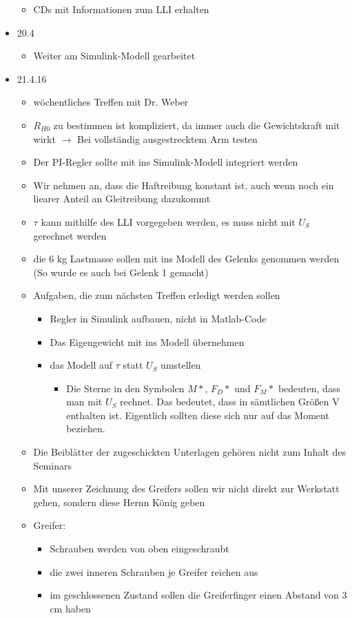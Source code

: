 \documentclass[a4paper,12pt]{article}
\begin{document}
\begin{itemize}
\begin{itemize}
		\item CDs mit Informationen zum LLI erhalten
	\end{itemize}
	\item 20.4
	\begin{itemize}
		\item Weiter am Simulink-Modell gearbeitet
	\end{itemize}
	\item 21.4.16
	\begin{itemize}
		\item wöchentliches Treffen mit Dr. Weber
		\item $R_{H0}$ zu bestimmen ist kompliziert, da immer auch die Gewichtskraft mit wirkt $\rightarrow$ Bei vollständig ausgestrecktem Arm testen
		\item Der PI-Regler sollte mit ins Simulink-Modell integriert werden
		\item Wir nehmen an, dass die Haftreibung konstant ist, auch wenn noch ein liearer Anteil an Gleitreibung dazukommt
		\item $\tau$ kann mithilfe des LLI vorgegeben werden, es muss nicht mit $U_S$ gerechnet werden
		\item die 6 kg Lastmasse sollen mit ins Modell des Gelenks genommen werden (So wurde es auch bei Gelenk 1 gemacht)
		\item Aufgaben, die zum nächsten Treffen erledigt werden sollen
			\begin{itemize}
				\item Regler in Simulink aufbauen, nicht in Matlab-Code
				\item Das Eigengewicht mit ins Modell übernehmen
				\item das Modell auf $\tau$ statt $U_S$ umstellen
				\begin{itemize}
					\item Die Sterne in den Symbolen $M*$, $F_D*$ und $F_M*$ bedeuten, dass man mit $U_S$ rechnet. Das bedeutet, dass in sämtlichen Größen V enthalten ist. Eigentlich sollten diese sich nur auf das Moment beziehen.
				\end{itemize}
			\end{itemize}
		\item Die Beiblätter der zugeschickten Unterlagen gehören nicht zum Inhalt des Seminars
		\item Mit unserer Zeichnung des Greifers sollen wir nicht direkt zur Werkstatt gehen, sondern diese Hernn König geben
		\item Greifer:
		\begin{itemize}
			\item Schrauben werden von oben eingeschraubt
			\item die zwei inneren Schrauben je Greifer reichen aus
			\item im geschlossenen Zustand sollen die Greiferfinger einen Abstand von 3 cm haben
		\end{itemize}
	\end{itemize}
\end{itemize}
\end{document}
